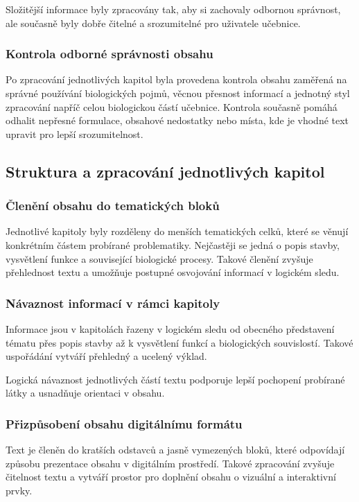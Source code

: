 \documentclass[12pt]{article}
\begin{document}
    Složitější informace byly zpracovány tak, aby si zachovaly odbornou správnost, ale současně byly dobře čitelné a srozumitelné pro uživatele učebnice.

    \subsubsection{Kontrola odborné správnosti obsahu}
     Po zpracování jednotlivých kapitol byla provedena kontrola obsahu zaměřená na správné používání biologických pojmů, věcnou přesnost informací a jednotný styl zpracování napříč celou biologickou částí učebnice.
     Kontrola současně pomáhá odhalit nepřesné formulace, obsahové nedostatky nebo místa, kde je vhodné text upravit pro lepší srozumitelnost. \cite{NovotnyBiologieCloveka}

    \subsection{Struktura a zpracování jednotlivých kapitol}
    \subsubsection{Členění obsahu do tematických bloků}
    Jednotlivé kapitoly byly rozděleny do menších tematických celků, které se věnují konkrétním částem probírané problematiky. Nejčastěji se jedná o popis stavby, vysvětlení funkce a související biologické procesy.
    Takové členění zvyšuje přehlednost textu a umožňuje postupné osvojování informací v logickém sledu.

    \subsubsection{Návaznost informací v rámci kapitoly}
    Informace jsou v kapitolách řazeny v logickém sledu od obecného představení tématu přes popis stavby až k vysvětlení funkcí a biologických souvislostí. Takové uspořádání vytváří přehledný a ucelený výklad.

    Logická návaznost jednotlivých částí textu podporuje lepší pochopení probírané látky a usnadňuje orientaci v obsahu.

    \subsubsection{Přizpůsobení obsahu digitálnímu formátu}
    Text je členěn do kratších odstavců a jasně vymezených bloků, které odpovídají způsobu prezentace obsahu v digitálním prostředí. Takové zpracování zvyšuje čitelnost textu a vytváří prostor pro doplnění obsahu o vizuální a interaktivní prvky.
\end{document}

